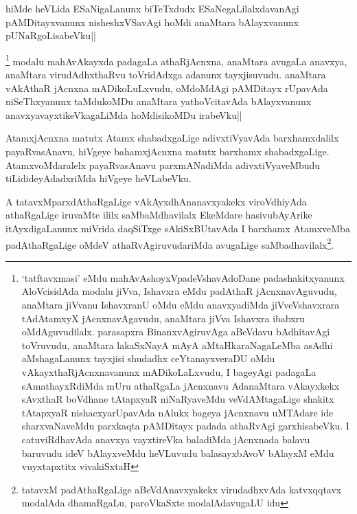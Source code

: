 \begin{artha}
hiMde heVLida ESaNigaLanunx biTeTxdudx ESaNegaLilalxdavanAgi pAMDitayxvanunx nisheshxVSavAgi hoMdi anaMtara bAlayxvanunx pUNaRgoLisabeVku||
\end{artha}


\begin{artha}
\footnote[1]{`tatftavxmasi' eMdu mahAvAshoyxVpadeVshavAdoDane padashakitxyanunx AloVcisidAda modalu jiVva, Ishavxra eMdu padAthaR jAcnxnavAguvudu, anaMtara jiVvanu IshavxranU oMdu eMdu anavxyadiMda jiVveVshavxrara tAdAtamxyX jAcnxnavAgavudu, anaMtara jiVva Ishavxra ibabxru oMdAguvudilalx. parasapxra BinanxvAgiruvAga aBeVdavu bAdhitavAgi toVruvudu, anaMtara lakaSxNayA mAyA aMtaHkaraNagaLeMba asAdhi aMshagaLanunx tayxjisi shudadhx ceYtanayxveraDU oMdu vAkayxthaRjAcnxnavanunx mADikoLaLxvudu, I bageyAgi padagaLa sAmathayxRdiMda mUru athaRgaLa jAcnxnavu AdanaMtara vAkayxkekx sAvxthaR boVdhane tAtapxyaR niNaRyaveMdu veVdAMtagaLige shakitx tAtapxyaR nishacxyarUpavAda nAlukx bageya jAcnxnavu uMTAdare ide sharxvaNaveMdu parxkaqta pAMDitayx padada athaRvAgi garxhisabeVku. I catuviRdhavAda anavxya vayxtireVka baladiMda jAcnxnada balavu baruvudu ideV bAlayxveMdu heVLuvudu balasayxbAvoV bAlayxM eMdu vuyxtapxtitx vivakiSxtaH} modalu mahAvAkayxda padagaLa athaRjAcnxna, anaMtara avugaLa anavxya, anaMtara virudAdhxthaRvu toVridAdxga adanunx tayxjisuvudu. anaMtara vAkAthaR jAcnxna mADikoLuLxvudu, oMdoMdAgi pAMDitayx rUpavAda niSeThxyanunx taMdukoMDu anaMtara yathoVcitavAda bAlayxvanunx anavxyavayxtikeVkagaLiMda hoMdisikoMDu irabeVku||
\end{artha}


\begin{artha}
AtamxjAcnxna matutx Atamx shabadxgaLige adivxtiVyavAda barxhamxdalilx payaRvasAnavu, hiVgeye bahamxjAcnxna matutx barxhamx shabadxgaLige. AtamxvoMdaralelx payaRvasAnavu parxmANadiMda adivxtiVyaveMbudu tiLidideyAdadxriMda hiVgeye heVLabeVku.
\end{artha}

\begin{artha}
A tatavxMparxdAthaRgaLige vAkAyxdhAnanavxyakekx viroVdhiyAda athaRgaLige iruvaMte ililx saMbaMdhavilalx EkeMdare hasivubAyArike itAyxdigaLanunx miVrida daqSiTxge sAkiSxBUtavAda I barxhamx AtamxveMba padAthaRgaLige oMdeV athaRvAgiruvudariMda avugaLige saMbadhavilalx\footnote[1]{tatavxM padAthaRgaLige aBeVdAnavxyakekx virudadhxvAda katvxqqtavx modalAda dhamaRgaLu, paroVkaSxte modalAdavugaLU idu}.
\end{artha}

